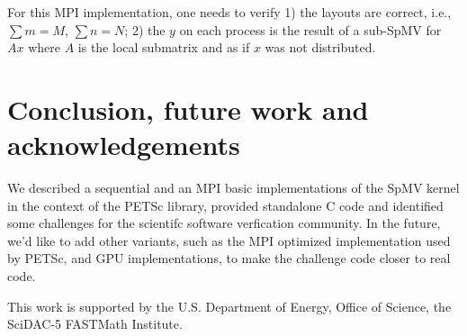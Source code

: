 \documentclass[submission]{eptcs}
\begin{document}
For this MPI implementation, one needs to verify 1) the layouts are correct, i.e., $\sum m = M$, $\sum n = N$;
2) the $y$ on each process is the result of a sub-SpMV for $Ax$ where $A$ is the local submatrix and
as if $x$ was not distributed.


\section{Conclusion, future work and acknowledgements}
We described a sequential and an MPI basic implementations of the SpMV kernel
in the context of the PETSc library, provided standalone C code and identified
some challenges for the scientifc software verfication community.
In the future, we'd like to add other variants,
such as the MPI optimized implementation used by PETSc, and GPU implementations, to make the challenge code closer to real code.

This work is supported by the U.S. Department of Energy, Office of Science, the SciDAC-5 FASTMath Institute.

\nocite{*}


\end{document}
